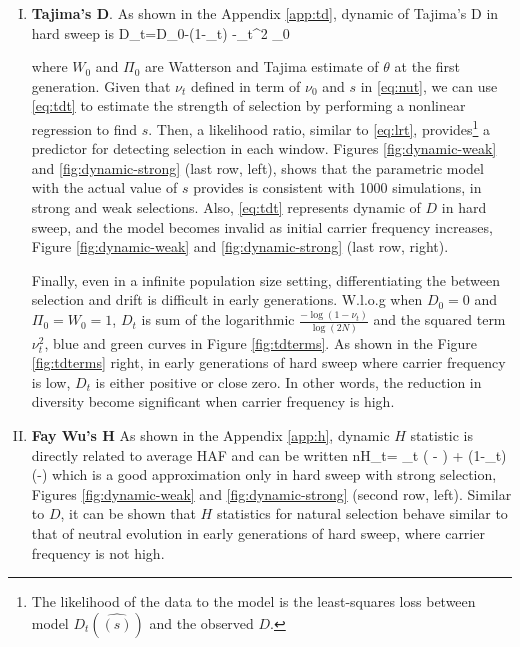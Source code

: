 \documentclass[11pt]{article}
\begin{document}
\begin{enumerate}[I.]
	\item {\bf Tajima's D}. As shown in the Appendix \ref{app:td}, dynamic of 
	Tajima's D in hard sweep is
	\beq
	D_t=D_0-\log(1-\nu_t)  -\nu_t^2 \Pi_0\label{eq:tdt}
	\eeq

	where $W_0$ and $\Pi_0$ are Watterson and Tajima estimate 
	of $\theta$ at 
	the first generation.
	Given that $\nu_t$ defined in term of $\nu_0$ and $s$ in 
	\eqref{eq:nut}, we 
	can use \eqref{eq:tdt} to estimate the strength of 
	selection by performing a nonlinear 
	regression to find 
	$s$. Then, a likelihood ratio, similar to \eqref{eq:lrt}, 
	provides\footnote{The 
	likelihood of the data to the model is the least-squares 
	loss between model 
	$D_t(\hat{(s)})$ and the observed $D$.} a predictor for 
	detecting selection in each window. Figures \ref{fig:dynamic-weak} and 
	\ref{fig:dynamic-strong} (last 
	row, left), shows that the parametric model with the actual value of $s$ 
	provides is consistent with 1000 simulations, in strong and weak 
	selections. Also, \eqref{eq:tdt} represents dynamic of $D$ in hard 
	sweep, and the 
	model becomes invalid as initial carrier frequency increases, Figure 
	\ref{fig:dynamic-weak} and \ref{fig:dynamic-strong} (last 
	row, right).
	
	Finally, even in a infinite population size setting, 
	differentiating the between selection and drift is difficult in early 
	generations. W.l.o.g when $D_0=0$ and $\Pi_0=W_0=1$, 
	$D_t$ is sum of the 
	logarithmic $\frac{-\log(1-\nu_t)}{\log(2N)}$ and the squared term 
	$\nu_t^2$, blue and green curves in 
	Figure 
	\ref{fig:tdterms}. As shown in the Figure 
	\ref{fig:tdterms} right, in early 
	generations of hard sweep where carrier frequency is low, 
	$D_t$ is either 
	positive or close zero. In other words, the reduction in 
	diversity become 
	significant when carrier frequency is high.
	
	
	
	\item {\bf Fay Wu's H} As shown in the Appendix \ref{app:h}, dynamic $H$ 
	statistic is directly related to average HAF \cite{ronen2015predicting} and 
	can be written
	\beq
	nH_t= \theta \nu_t \left( - \right) +
	\theta (1-\nu_t)\left(-\right) 
	\label{eq:ht}
	\eeq
	which is a good approximation only in hard sweep with strong selection, 
	Figures 
	\ref{fig:dynamic-weak} and \ref{fig:dynamic-strong} (second
	row, left). Similar to $D$, it can be shown that $H$ statistics for natural 
	selection behave similar to that of neutral evolution in early generations 
	of hard sweep, where carrier frequency is not high.
	

\end{enumerate}
\end{document}
